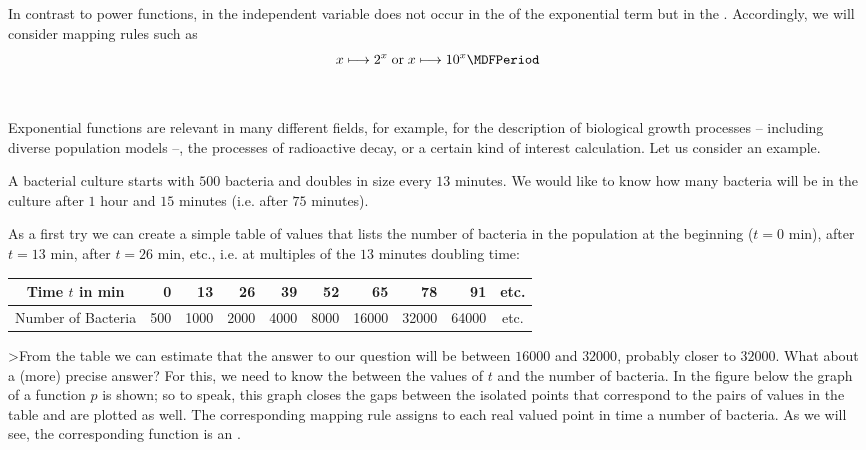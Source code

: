 \begin{MIntro}

In contrast to power functions, in  the independent variable 
does not occur in the  of the exponential term but in the .
Accordingly, we will consider mapping rules such as
$$x \longmapsto 2^x\; \text{or}\; x \longmapsto 10^x \MDFPeriod$$
\ \\ \ \\
Exponential functions are relevant in many different fields, for example, for the description of 
biological growth processes -- including diverse population models --, the processes of radioactive decay, or 
a certain kind of interest calculation. Let us consider an example.

\begin{MExample}

A bacterial culture starts with $500$ bacteria and doubles in size every $13$ minutes. We would like to know how many
bacteria will be in the culture after $1$ hour and $15$ minutes (i.e. after $75$ minutes).

As a first try we can create a simple table of values that lists the number of bacteria in the population at 
the beginning ($t=0$ min), after $t = 13$ min, after $t = 26$ min, etc., i.e. at multiples of the 
$13$ minutes doubling time:
\begin{center}
 \begin{tabular}{|c|r|r|r|r|r|r|r|r|c|}
 \hline
 Time $t$ in min & 0 & 13 & 26 & 39 & 52 & 65 & 78 & 91 & etc. \\ \hline
 Number of Bacteria & 500 & 1000 & 2000 & 4000 & 8000 & 16000 & 32000 & 64000 & etc. \\ 
 \hline
 \end{tabular}
\end{center}
>From the table we can estimate that the answer to our question will be between $16000$ and $32000$, probably 
closer to $32000$. What about a (more) precise answer? For this, we need to know the 
 between the values of $t$ and the number of bacteria. In the figure below 
the graph of a function $p$ is shown; so to speak, this graph closes the gaps between the isolated points that 
correspond to the pairs of values in the table and are plotted as well. The corresponding mapping rule 
assigns to each real valued point in time a number of bacteria. As we will see, the corresponding function 
is an .


\end{MExample}
\end{MIntro}
